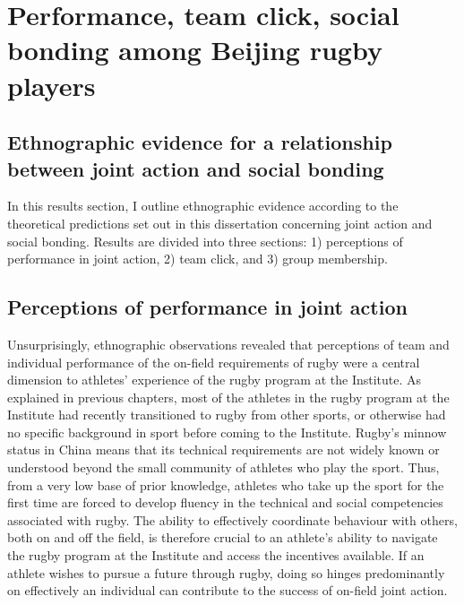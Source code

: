 
\begin{savequote}[8cm]

  \qauthor{}
\end{savequote}



\chapter{Performance, team click, social bonding among Beijing rugby players\label{chap:ethnoResults}}

\minitoc






                                      \begin{CJK}{UTF8}{gbsn}

\section{Ethnographic evidence for a relationship between joint action and social bonding}


In this results section, I outline ethnographic evidence according to the theoretical predictions set out in this dissertation concerning joint action and social bonding. Results are divided into three sections: 1) perceptions of performance in joint action, 2) team click, and 3) group membership.






\section{Perceptions of performance in joint action}
Unsurprisingly, ethnographic observations revealed that perceptions of team and individual performance of the on-field requirements of rugby were a central dimension to athletes' experience of the rugby program at the Institute.  As explained in previous chapters, most of the athletes in the rugby program at the Institute had recently transitioned to rugby from other sports, or otherwise had no specific background in sport before coming to the Institute.  Rugby's minnow status in China means that its technical requirements are not widely known or understood beyond the small community of athletes who play the sport.  Thus, from a very low base of prior knowledge, athletes who take up the sport for the first time are forced to develop fluency in the technical and social competencies associated with rugby.  The ability to effectively coordinate behaviour with others, both on and off the field, is therefore crucial to an athlete's ability to navigate the rugby program at the Institute and access the incentives available.  If an athlete wishes to pursue a future through rugby, doing so hinges predominantly on effectively an individual can contribute to the success of on-field joint action.


\end{CJK}
